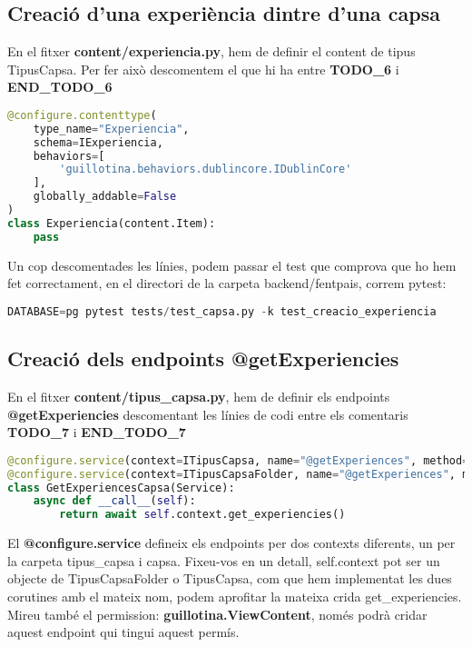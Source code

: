 \documentclass[a4paper, 11pt]{article}
\begin{document}
\subsection{Creació d'una experiència dintre d'una capsa}
En el fitxer \textbf{content/experiencia.py}, hem de definir el content de tipus
  TipusCapsa. Per fer això descomentem el que hi ha entre
  \textbf{TODO\_6} i \textbf{END\_TODO\_6}

\begin{lstlisting}[language=Python, caption=Definició content type Experiencia]
@configure.contenttype(
    type_name="Experiencia",
    schema=IExperiencia,
    behaviors=[
        'guillotina.behaviors.dublincore.IDublinCore'
    ],
    globally_addable=False
)
class Experiencia(content.Item):
    pass
\end{lstlisting}

Un cop descomentades les línies, podem passar el test que comprova
  que ho hem fet correctament, en el directori de la carpeta
  backend/fentpais, correm pytest:
  \begin{lstlisting}[language=Python, caption=Testing 3]
    DATABASE=pg pytest tests/test_capsa.py -k test_creacio_experiencia
  \end{lstlisting}

\subsection{Creació dels endpoints @getExperiencies}
En el fitxer \textbf{content/tipus\_capsa.py}, hem de definir els
endpoints \textbf{{@}getExperiencies} descomentant les línies de codi
entre els comentaris \textbf{TODO\_7} i \textbf{END\_TODO\_7}

\begin{lstlisting}[language=Python, caption=Definició endpoints]
@configure.service(context=ITipusCapsa, name="@getExperiences", method="GET", permission="guillotina.ViewContent")
@configure.service(context=ITipusCapsaFolder, name="@getExperiences", method="GET", permission="guillotina.ViewContent")
class GetExperiencesCapsa(Service):
    async def __call__(self):
        return await self.context.get_experiencies()
\end{lstlisting}
      
El \textbf{{@}configure.service} defineix els endpoints per dos contexts
diferents, un per la carpeta tipus\_capsa i capsa. Fixeu-vos en un
detall, self.context pot ser un objecte de TipusCapsaFolder o
TipusCapsa, com que hem implementat les dues corutines amb el mateix
nom, podem aprofitar la mateixa crida get\_experiencies. Mireu també
el permission: \textbf{guillotina.ViewContent}, només podrà cridar aquest
endpoint qui tingui aquest permís.
      
\end{document}
